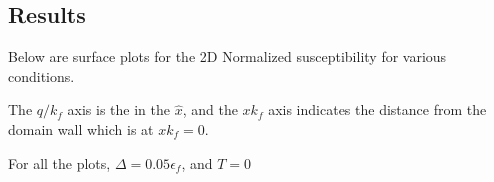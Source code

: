 \documentclass[aps,prl,twocolumn,showpacs,amsmath,amssymb]{revtex4-1}
\begin{document}
% 
% 
\begin{widetext}
\section*{Results}
%

Below are surface plots for the 2D Normalized susceptibility for various conditions.

The $q/k_f$ axis is the in the $\hat{x}$, and the $xk_f$ axis indicates the distance from the domain wall which is at $xk_f = 0$.

For all the plots, $\Delta = 0.05\epsilon_f$, and $T=0$


\end{widetext}
\end{document}
